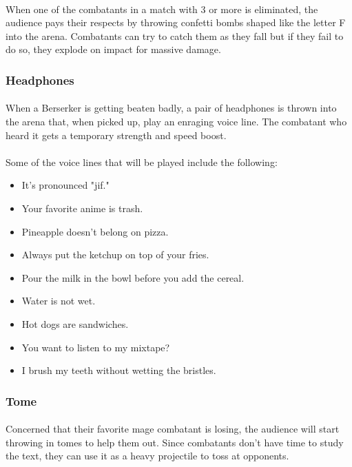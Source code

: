 \paragraph{} When one of the combatants in a match with 3 or more is eliminated, the audience pays their respects by throwing confetti bombs shaped like the letter F into the arena. Combatants can try to catch them as they fall but if they fail to do so, they explode on impact for massive damage.

\subsubsection{Headphones}

\paragraph{} When a Berserker is getting beaten badly, a pair of headphones is thrown into the arena that, when picked up, play an enraging voice line. The combatant who heard it gets a temporary strength and speed boost.

\paragraph{} Some of the voice lines that will be played include the following:

\begin{itemize}
    \item It's pronounced "jif."
    \item Your favorite anime is trash.
    \item Pineapple doesn't belong on pizza.
    \item Always put the ketchup on top of your fries.
    \item Pour the milk in the bowl before you add the cereal.
    \item Water is not wet.
    \item Hot dogs are sandwiches.
    \item You want to listen to my mixtape?
    \item I brush my teeth without wetting the bristles.
\end{itemize}

\subsubsection{Tome}

\paragraph{} Concerned that their favorite mage combatant is losing, the audience will start throwing in tomes to help them out. Since combatants don't have time to study the text, they can use it as a heavy projectile to toss at opponents.

